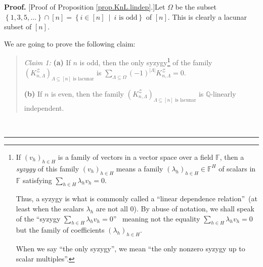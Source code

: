 \documentclass[numbers=enddot,12pt,final,onecolumn,notitlepage]{scrartcl}%
\theoremstyle{definition}
\newenvironment{statement}{\begin{quote}}{\end{quote}}
\newenvironment{proof}[1][Proof]{\noindent\textbf{#1.} }{\ \rule{0.5em}{0.5em}}
\let\sumnonlimits\sum
\renewcommand{\sum}{\sumnonlimits\limits}
\begin{document}
\begin{proof}
[Proof of Proposition \ref{prop.KnL.lindep}.]Let $\Omega$ be the subset
$\left\{  1,3,5,\ldots\right\}  \cap\left[  n\right]  =\left\{  i\in\left[
n\right]  \ \mid\ i\text{ is odd}\right\}  $ of $\left[  n\right]  $. This is
clearly a lacunar subset of $\left[  n\right]  $.

We are going to prove the following claim:

\begin{statement}
\textit{Claim 1:} \textbf{(a)} If $n$ is odd, then the only syzygy\footnote{If
$\left(  v_{h}\right)  _{h\in H}$ is a family of vectors in a vector space
over a field $\mathbb{F}$, then a \textit{syzygy} of this family $\left(
v_{h}\right)  _{h\in H}$ means a family $\left(  \lambda_{h}\right)  _{h\in
H}\in\mathbb{F}^{H}$ of scalars in $\mathbb{F}$ satisfying $\sum_{h\in
H}\lambda_{h}v_{h}=0$.
\par
Thus, a syzygy is what is commonly called a \textquotedblleft linear
dependence relation\textquotedblright\ (at least when the scalars $\lambda
_{h}$ are not all $0$). By abuse of notation, we shall speak of the
\textquotedblleft syzygy $\sum_{h\in H}\lambda_{h}v_{h}=0$\textquotedblright%
\ meaning not the equality $\sum_{h\in H}\lambda_{h}v_{h}=0$ but the family of
coefficients $\left(  \lambda_{h}\right)  _{h\in H}$.
\par
When we say \textquotedblleft the only syzygy\textquotedblright, we mean
\textquotedblleft the only nonzero syzygy up to scalar
multiples\textquotedblright.} of the family $\left(  K_{n,\Lambda
}^{\mathcal{Z}}\right)  _{\Lambda\subseteq\left[  n\right]  \text{ is
lacunar}}$ is $\sum_{\Lambda\subseteq\Omega}\left(  -1\right)  ^{\left\vert
\Lambda\right\vert }K_{n,\Lambda}^{\mathcal{Z}}=0$.

\textbf{(b)} If $n$ is even, then the family $\left(  K_{n,\Lambda
}^{\mathcal{Z}}\right)  _{\Lambda\subseteq\left[  n\right]  \text{ is
lacunar}}$ is $\mathbb{Q}$-linearly independent.
\end{statement}


\end{proof}
\end{document}

